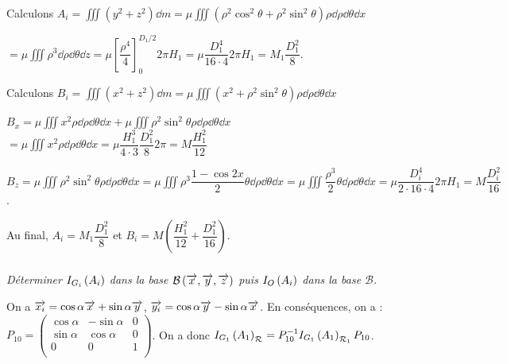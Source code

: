 \documentclass[10pt,fleqn]{article} %
\begin{document}
\begin{multicols}{2}
\begin{corrige}
Calculons $A_i = \iiint \left(y^2+z^2\right)  \dd m=\mu \iiint \left(\rho^2\cos^2\theta +\rho^2\sin^2\theta\right) \rho \dd \rho \dd \theta \dd x  $

$ = \mu \iiint \rho^3  \dd \rho \dd \theta \dd z  = \mu \left[ \dfrac{\rho^4}{4}\right]_{0}^{D_1/2}2\pi H_1 = \mu \dfrac{D_1^4}{16\cdot 4}2\pi H_1 = M_1 \dfrac{D_1^2}{8}$.


Calculons $B_i = \iiint \left(x^2+z^2\right)  \dd m=\mu \iiint \left(x^2 +\rho^2\sin^2\theta\right) \rho \dd \rho \dd \theta \dd x$ 

$B_x=\mu \iiint x^2  \rho \dd \rho \dd \theta \dd x+\mu \iiint \rho^2\sin^2\theta \rho \dd \rho \dd \theta \dd x  $
$=\mu \iiint x^2  \rho \dd \rho \dd \theta \dd x = \mu \dfrac{H_1^3}{4\cdot 3}\dfrac{D_1^2}{8} 2\pi  = M  \dfrac{H_1^2}{12}   $

$B_z =\mu \iiint \rho^2\sin^2\theta \rho \dd \rho \dd \theta \dd x =\mu \iiint \rho^3\dfrac{1-\cos 2x}{2}\theta  \dd \rho \dd \theta \dd x=\mu \iiint \dfrac{\rho^3}{2}\theta  \dd \rho \dd \theta \dd x =\mu \dfrac{D_i^4}{2\cdot 16\cdot 4}2 \pi H_1 =M  \dfrac{D_i^2}{16}$.

Au final, $A_i =M_1 \dfrac{D_1^2}{8}$ et  $B_i =M\left(\dfrac{H_1^2}{12} + \dfrac{D_1^2}{16} \right)$.





\end{corrige}
\else
\fi

\subparagraph{}
\textit{Déterminer $I_{G_i}\left( A_i\right)$ dans la base $\mathcal{B}\left(\overrightarrow{x},\overrightarrow{y},\overrightarrow{z} \right)$ puis 
$I_{O}\left( A_i\right)$ dans la base $\mathcal{B}$.}
\ifprof
\begin{corrige}
 On a $\overrightarrow{x_i}=\cos\alpha\overrightarrow{x}+\sin\alpha\overrightarrow{y}$, $\overrightarrow{y_i}=\cos\alpha\overrightarrow{y}-\sin\alpha\overrightarrow{x}$. 
 En conséquences, on a : 
$P_{10}=\begin{pmatrix} \cos \alpha & - \sin\alpha & 0 \\ \sin \alpha & \cos \alpha & 0 \\ 0 & 0 & 1 \\ \end{pmatrix}$. 
On a donc 
$I_{G_1}\left( A_1\right)_{\mathcal{R}_{}}=P_{10}^{-1}I_{G_1}\left( A_1\right)_{\mathcal{R}_{1}}P_{10}$. 


\end{corrige}
\end{multicols}
\end{document}
